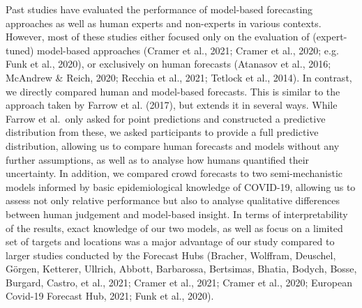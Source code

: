 \documentclass[
]{article}
\begin{document}
Past studies have evaluated the performance of model-based forecasting approaches as well as human experts and non-experts in various contexts. However, most of these studies either focused only on the evaluation of (expert-tuned) model-based approaches (Cramer et al., 2021; Cramer et al., 2020; e.g. Funk et al., 2020), or exclusively on human forecasts (Atanasov et al., 2016; McAndrew \& Reich, 2020; Recchia et al., 2021; Tetlock et al., 2014). In contrast, we directly compared human and model-based forecasts. This is similar to the approach taken by Farrow et al. (2017), but extends it in several ways. While Farrow et al.~only asked for point predictions and constructed a predictive distribution from these, we asked participants to provide a full predictive distribution, allowing us to compare human forecasts and models without any further assumptions, as well as to analyse how humans quantified their uncertainty. In addition, we compared crowd forecasts to two semi-mechanistic models informed by basic epidemiological knowledge of COVID-19, allowing us to assess not only relative performance but also to analyse qualitative differences between human judgement and model-based insight. In terms of interpretability of the results, exact knowledge of our two models, as well as focus on a limited set of targets and locations was a major advantage of our study compared to larger studies conducted by the Forecast Hubs (Bracher, Wolffram, Deuschel, Görgen, Ketterer, Ullrich, Abbott, Barbarossa, Bertsimas, Bhatia, Bodych, Bosse, Burgard, Castro, et al., 2021; Cramer et al., 2021; Cramer et al., 2020; European Covid-19 Forecast Hub, 2021; Funk et al., 2020).
\end{document}
